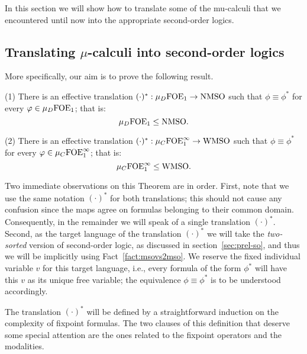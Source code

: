 
In this section we will show how to translate some of the mu-calculi that we
encountered until now into the appropriate second-order logics.

\subsection{Translating $\mu$-calculi into second-order logics}

More specifically, our aim is to prove the following result.

\begin{theorem}
\label{t:mfl2mso}
(1) There is an effective translation $(\cdot)^{*}: \mu_{D}\mathrm{FOE}_1 \to \mathrm{NMSO}$
such that $\phi \equiv \phi^{*}$ for every $\varphi \in \mu_{D}\mathrm{FOE}_1$; that is:
\[
\mu_{D}\mathrm{FOE}_1 \leq \mathrm{NMSO}.
\]

(2) There is an effective translation $(\cdot)^{*}: \mu_{C}\mathrm{FOE}^{\infty}_1 \to \mathrm{WMSO}$
such that $\phi \equiv \phi^{*}$ for every $\varphi \in \mu_{C}\mathrm{FOE}^{\infty}_1$; that is:
\[
\mu_{C}\mathrm{FOE}^{\infty}_1 \leq \mathrm{WMSO}.
\]
\end{theorem}

Two immediate observations on this Theorem are in order.
First, note that we use the same notation $(\cdot)^{*}$ for both translations; 
this should not cause any confusion since the maps agree on formulas belonging 
to their common domain.
Consequently, in the remainder we will speak of a single translation 
$(\cdot)^{*}$.
Second, as the target language of the translation $(\cdot)^{*}$ we will take 
the \emph{two-sorted} version of second-order logic, as discussed in 
section~\ref{sec:prel-so}, and thus we will be implicitly using 
Fact~\ref{fact:msovs2mso}.
We reserve the fixed individual variable $v$ for this target language, i.e., 
every formula of the form $\phi^{*}$ will have this $v$ as its unique free 
variable; the equivalence $\phi \equiv \phi^{*}$ is to be understood accordingly.

The translation $(\cdot)^{*}$ will be defined by a straightforward induction on
the complexity of fixpoint formulas.
The two clauses of this definition that deserve some special attention are the
ones related to the fixpoint operators and the modalities.

